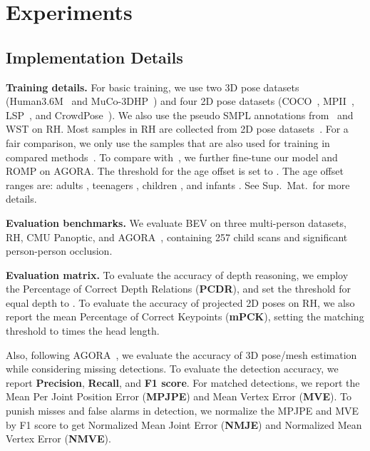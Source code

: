 \documentclass[10pt,twocolumn,letterpaper]{article}
\begin{document}
\section{Experiments}
\label{sec:experiments}

\subsection{Implementation Details}

\textbf{Training details.}
For basic training, we use two 3D pose datasets (Human3.6M~\cite{h36m} and MuCo-3DHP~\cite{mehta2018single}) and four 2D pose datasets (COCO~\cite{coco}, MPII~\cite{mpii}, LSP~\cite{lsp_extended}, and CrowdPose~\cite{crowdpose}). 
We also use the pseudo SMPL annotations from~\cite{joo2020eft} and WST on RH.
Most samples in RH are collected from 2D pose datasets~\cite{coco,crowdpose,zhang2019pose2seg}.
For a fair comparison, we only use the samples that are also used for training in compared methods~\cite{romp,moon2019camera,jiang2020coherent,zhen2020smap,kolotouros2019spin,Kocabas_SPEC_2021}.
To compare with~\cite{Kocabas_SPEC_2021,patel2021agora}, we further fine-tune our model and ROMP on AGORA.
The threshold for the age offset is set to .
The age offset ranges  are: adults , teenagers , children , and infants .
See Sup.~Mat.~for more details. 


\textbf{Evaluation benchmarks.}
We evaluate BEV on three multi-person datasets, RH, CMU Panoptic, \cite{cmu_panoptic} and AGORA~\cite{patel2021agora}, containing 257 child scans and significant person-person occlusion. 

\textbf{Evaluation matrix.}
To evaluate the accuracy of depth reasoning, we employ the Percentage of Correct Depth Relations (\textbf{PCDR}), and set the threshold for equal depth to .
To evaluate the accuracy of projected 2D poses on RH, we also report the mean Percentage of Correct Keypoints (\textbf{mPCK}),  setting the matching threshold to  times the head length.

Also, following AGORA~\cite{patel2021agora}, we evaluate the accuracy of 3D pose/mesh estimation while considering missing detections.
To evaluate the detection accuracy, we report \textbf{Precision}, \textbf{Recall}, and \textbf{F1 score}. For matched detections, we report the Mean Per Joint Position Error (\textbf{MPJPE}) and Mean Vertex Error (\textbf{MVE}). 
To punish misses and false alarms in detection, we normalize the MPJPE and MVE by F1 score to get Normalized Mean Joint Error (\textbf{NMJE}) and Normalized Mean Vertex Error (\textbf{NMVE}). 
\end{document}
